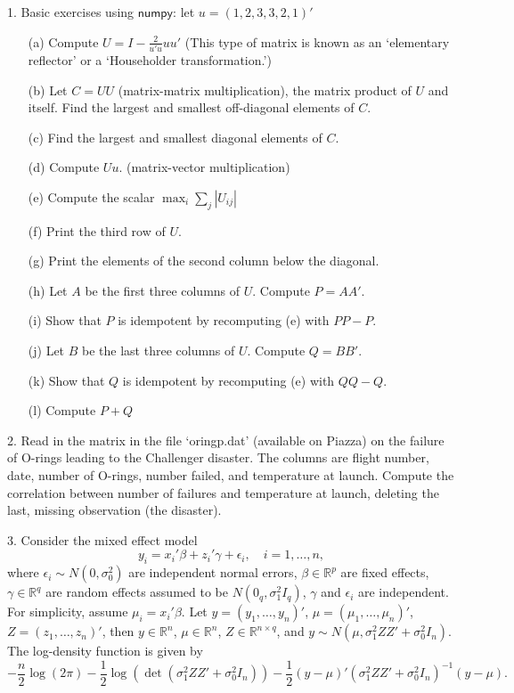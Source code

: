 \documentclass[twoside, letter]{article}
\begin{document}
1. Basic exercises using $\mathsf{numpy}$: let $u = (1, 2, 3, 3, 2, 1)'$
\begin{itemize}
\item[(a)] Compute $U = I - \frac{2}{u'u} uu'$ (This type of matrix is known as an
`elementary reflector' or a `Householder transformation.')
\item[(b)] Let $C = U U$ (matrix-matrix multiplication), the matrix product of $U$ and itself. Find the largest and smallest off-diagonal elements of $C$.
\item[(c)] Find the largest and smallest diagonal elements of $C$.
\item[(d)] Compute $U u$. (matrix-vector multiplication)
\item[(e)] Compute the scalar $\max_i \sum_j |U_{ij}|$
\item[(f)] Print the third row of $U$.
\item[(g)] Print the elements of the second column below the diagonal.
\item[(h)] Let $A$ be the first three columns of $U$. Compute $P = AA'$.
\item[(i)] Show that $P$ is idempotent by recomputing (e) with $PP-P$.
\item[(j)] Let $B$ be the last three columns of $U$. Compute $Q = BB'$.
\item[(k)] Show that $Q$ is idempotent by recomputing (e) with $QQ-Q$.
\item[(l)] Compute $P + Q$
\end{itemize}

2. Read in the matrix in the file `oringp.dat' (available on Piazza) on the failure of O-rings leading to the Challenger
disaster. The columns are flight number, date, number of O-rings, number failed, and temperature at launch. Compute the correlation between number of failures and temperature at
launch, deleting the last, missing observation (the disaster).

3. Consider the mixed effect model 
$$
y_i = x_i' \beta + z_i' \gamma + \epsilon_i, \quad i = 1, \dots, n,
$$
where $\epsilon_i \sim N(0, \sigma_0^2)$ are independent normal errors, $\beta \in \mathbb{R}^p$ are fixed effects, $\gamma \in \mathbb{R}^q$ are random effects assumed to be $N(0_q, \sigma_1^2 I_q)$, $\gamma$ and $\epsilon_i$ are independent. For simplicity, assume $\mu_i = x_i' \beta$. 
Let $ y = (y_1, \dots, y_n)'$, $ \mu = (\mu_1, \dots, \mu_n)'$, 
$ Z = (z_1, \dots, z_n)'$, 
then
$ y \in \mathbb{R}^{n}$, $ \mu \in \mathbb{R}^n$, $ Z \in \mathbb{R}^{n \times q}$,
and 
$ y \sim N( \mu, \sigma_1^2 ZZ'  + \sigma_0^2 I_n)$.
The log-density function is given by
$$
 -\frac{n}{2} \log(2 \pi) - \frac{1}{2} \log (\det(\sigma_1^2 ZZ' + \sigma_0^2 I_n)) - \frac{1}{2} (y-\mu)'(\sigma_1^2 ZZ' + \sigma_0^2I_n)^{-1} (y-\mu).
$$
\end{document}
